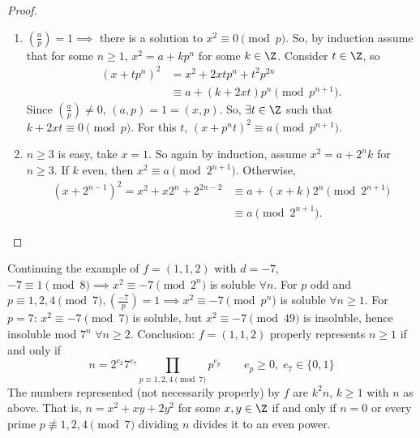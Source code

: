 \documentclass{article}
\newcommand{\legendre}[2]{\genfrac{(}{)}{}{}{#1}{#2}}
\begin{document}
\begin{proof}
    \begin{enumerate}[label=(\roman*)]
        \item $\legendre{a}{p} = 1 \implies $ there is a solution to $x^2 \equiv 0 \pmod{p}$.
            So, by induction assume that for some $n \geq 1$, $x^2 = a + k p^n$ for some $k \in \Z$.
            Consider $t \in \Z$, so
            \begin{align*}
                (x + t p^n)^2 &= x^2 + 2 x t p^n + t^2 p^{2n} \\
                              &\equiv a + (k+ 2xt)p^n \pmod{p^{n+1}}.
            \end{align*}
            Since $\legendre{a}{p} \neq 0$, $(a, p) = 1 = (x, p)$. So, $\exists t \in \Z$ such that $k + 2 x t \equiv 0 \pmod{p}$.
            For this $t$, $(x + p^n t)^2 \equiv a \pmod{p^{n+1}}$.
        \item $n \geq 3$ is easy, take $x=1$.
            So again by induction, assume $x^2 = a + 2^n k$ for $n \geq 3$.
            If $k$ even, then $x^2 \equiv a \pmod{2^{n+1}}$. Otherwise,
            \begin{align*}
                (x + 2^{n-1})^2 = x^2 + x 2^n + 2^{2n-2} &\equiv a + (x+k)2^n \pmod{2^{n+1}} \\
                                                         &\equiv a \pmod{2^{n+1}}.
            \end{align*}
    \end{enumerate}
\end{proof}

\begin{eg}
    Continuing the example of $f = (1, 1, 2)$ with $d = -7$,
    $-7 \equiv 1 \pmod{8} \implies x^2 \equiv -7 \pmod{2^n}$ is soluble $\forall n$.
    For $p$ odd and $ p \equiv 1, 2, 4 \pmod{7}, \legendre{-7}{p} = 1 \implies x^2 \equiv -7 \pmod{p^n}$ is soluble $\forall n \geq 1$.
    For $p = 7$: $x^2 \equiv -7 \pmod{7}$ is soluble, but $x^2 \equiv -7 \pmod{49}$ is insoluble, hence insoluble mod $7^n$ $\forall n \geq 2$.
    Conclusion: $f = (1, 1, 2)$ properly represents $n \geq 1$ if and only if
    \begin{equation*}
        n = 2^{e_2} 7^{e_7} \prod_{p \equiv 1, 2, 4 \pmod{7}} p^{e_p} \qquad e_p \geq 0, \; e_7 \in \{0, 1\}
    \end{equation*}
    The numbers represented (not necessarily properly) by $f$ are $k^2 n$, $k \geq 1$ with $n$ as above.
    That is, $n = x^2 + x y + 2y^2$ for some $x, y \in \Z$ if and only if $n = 0$ or every prime $p \not\equiv 1, 2, 4 \pmod{7}$ dividing $n$ divides it to an even power.
\end{eg}
\end{document}
